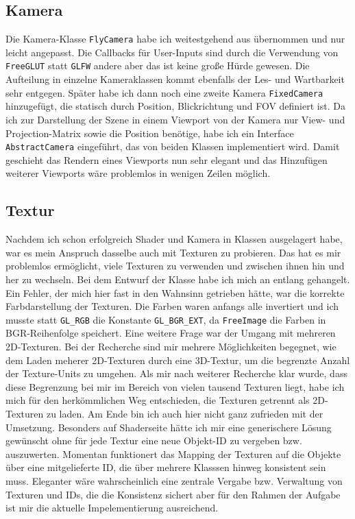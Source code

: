 \documentclass{article}
\let\oldsubsection\subsection
\renewcommand\subsection{\needspace{10\baselineskip}\oldsubsection}
\begin{document}
\subsection{Kamera}
Die Kamera-Klasse \texttt{FlyCamera} habe ich weitestgehend aus \cite{flycam-class} übernommen und nur leicht angepasst.
Die Callbacks für User-Inputs sind durch die Verwendung von \texttt{FreeGLUT} statt \texttt{GLFW} andere aber das ist keine große Hürde gewesen.
Die Aufteilung in einzelne Kameraklassen kommt ebenfalls der Les- und Wartbarkeit sehr entgegen.
Später habe ich dann noch eine zweite Kamera \texttt{FixedCamera} hinzugefügt, die statisch durch Position, Blickrichtung und FOV definiert ist.
Da ich zur Darstellung der Szene in einem Viewport von der Kamera nur View- und Projection-Matrix sowie die Position benötige, habe ich ein Interface \texttt{AbstractCamera} eingeführt, das von beiden Klassen implementiert wird.
Damit geschieht das Rendern eines Viewports nun sehr elegant und das Hinzufügen weiterer Viewports wäre problemlos in wenigen Zeilen möglich.

\subsection{Textur}
Nachdem ich schon erfolgreich Shader und Kamera in Klassen ausgelagert habe, war es mein Anspruch dasselbe auch mit Texturen zu probieren.
Das hat es mir problemlos ermöglicht, viele Texturen zu verwenden und zwischen ihnen hin und her zu wechseln.
Bei dem Entwurf der Klasse habe ich mich an \cite{texture} entlang gehangelt.
Ein Fehler, der mich hier fast in den Wahnsinn getrieben hätte, war die korrekte Farbdarstellung der Texturen.
Die Farben waren anfangs alle invertiert und ich musste statt \texttt{GL\_RGB} die Konstante \texttt{GL\_BGR\_EXT}, da \texttt{FreeImage} die Farben in BGR-Reihenfolge speichert.
Eine weitere Frage war der Umgang mit mehreren 2D-Texturen.
Bei der Recherche sind mir mehrere Möglichkeiten begegnet, wie dem Laden meherer 2D-Texturen durch eine 3D-Textur, um die begrenzte Anzahl der Texture-Units zu umgehen.
Als mir nach weiterer Recherche klar wurde, dass diese Begrenzung bei mir im Bereich von vielen tausend Texturen liegt, habe ich mich für den herkömmlichen Weg entschieden, die Texturen getrennt als 2D-Texturen zu laden.
Am Ende bin ich auch hier nicht ganz zufrieden mit der Umsetzung. Besonders auf Shaderseite hätte ich mir eine generischere Lösung gewünscht ohne für jede Textur eine neue Objekt-ID zu vergeben bzw. auszuwerten.
Momentan funktionert das Mapping der Texturen auf die Objekte über eine mitgelieferte ID, die über mehrere Klasssen hinweg konsistent sein muss.
Eleganter wäre wahrscheinlich eine zentrale Vergabe bzw. Verwaltung von Texturen und IDs, die die Konsistenz sichert aber für den Rahmen der Aufgabe ist mir die aktuelle Impelementierung ausreichend.
\end{document}
